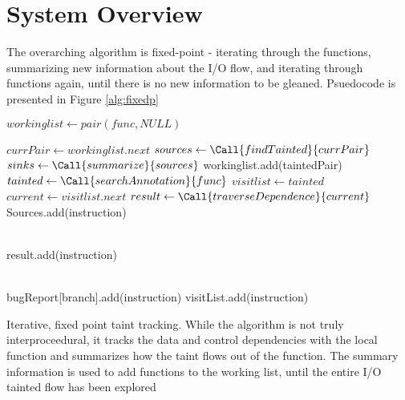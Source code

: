 \section{System Overview}

The overarching algorithm is fixed-point - iterating through the functions, summarizing new information about the I/O flow, and iterating through functions again, until there is no new information to be gleaned. Psuedocode is presented in Figure \ref{alg:fixedp}

\begin{algorithm}
\begin{algorithmic}
		\State $workinglist \gets pair(func, NULL)$
	\EndFor
	
		\State $currPair \gets workinglist.next$
		\State $sources \gets \Call{findTainted}{currPair}$ 
		\State $sinks \gets \Call{summarize}{sources}$
			\State workinglist.add(taintedPair)
		\EndFor
	\EndWhile
\EndFunction
\\
	\State $tainted \gets \Call{searchAnnotation}{func}$ 
	\State $visitlist \gets tainted$ 
		\State $current \gets visitlist.next$
		\State $result \gets \Call{traverseDependence}{current}$ 
				\State {}
			\Else 
				\State Sources.add(instruction) 
			\EndIf
			
		\EndFor
	\EndWhile
	\State {}
\EndFunction
\\
			\State result.add(instruction)
		\EndIf
		
	\EndFor
	
	\State {}
\EndFunction
\\
			\State bugReport[branch].add(instruction)
			\State visitList.add(instruction)
		\EndIf
	\EndFor
\EndFor
\EndFunction
\end{algorithmic}
\caption{Iterative, fixed point taint tracking. While the algorithm is not truly interproceedural, it tracks the data and control dependencies with the local function and summarizes how the taint flows out of the function. The summary information is used to add functions to the working list, until the entire I/O tainted flow has been explored}
\label{alg:fixedp}
\end{algorithm}
	
